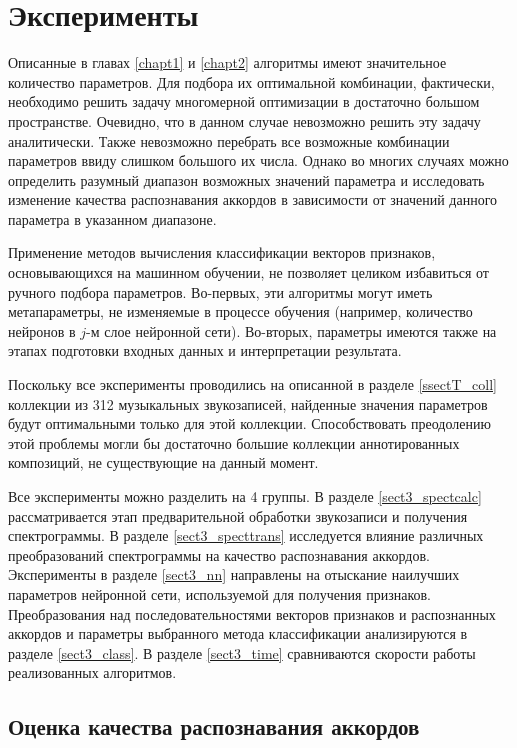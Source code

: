 \chapter{Эксперименты} \label{chapt3}

Описанные в главах \ref{chapt1} и \ref{chapt2} алгоритмы имеют значительное
количество параметров. Для подбора их оптимальной комбинации, фактически,
необходимо решить задачу многомерной оптимизации в достаточно большом
пространстве. Очевидно, что в данном случае невозможно решить эту задачу
аналитически. Также невозможно перебрать все возможные комбинации параметров
ввиду слишком большого их числа. Однако во многих случаях можно определить
разумный диапазон возможных значений параметра и исследовать изменение качества
распознавания аккордов в зависимости от значений данного параметра в указанном
диапазоне.

Применение методов вычисления классификации векторов признаков, основывающихся
на машинном обучении, не позволяет целиком избавиться от ручного подбора
параметров. Во-первых, эти алгоритмы могут иметь метапараметры, не изменяемые в
процессе обучения (например, количество нейронов в $j$-м слое нейронной сети).
Во-вторых, параметры имеются также на этапах подготовки входных данных и
интерпретации результата.

Поскольку все эксперименты проводились на описанной в разделе \ref{ssectT_coll}
коллекции из 312 музыкальных звукозаписей, найденные значения параметров будут
оптимальными только для этой коллекции. Способствовать преодолению этой проблемы
могли бы достаточно большие коллекции аннотированных композиций, не существующие
на данный момент.

Все эксперименты можно разделить на 4 группы. В разделе \ref{sect3_spectcalc}
рассматривается этап предварительной обработки звукозаписи и получения
спектрограммы. В разделе \ref{sect3_specttrans} исследуется влияние различных
преобразований спектрограммы на качество распознавания аккордов. Эксперименты
в разделе \ref{sect3_nn} направлены на отыскание наилучших параметров нейронной
сети, используемой для получения признаков. Преобразования над
последовательностями векторов признаков и распознанных аккордов и параметры
выбранного метода классификации анализируются в разделе \ref{sect3_class}. В
разделе \ref{sect3_time} сравниваются скорости работы реализованных алгоритмов.

\section{Оценка качества распознавания аккордов} \label{sect3_eval}

